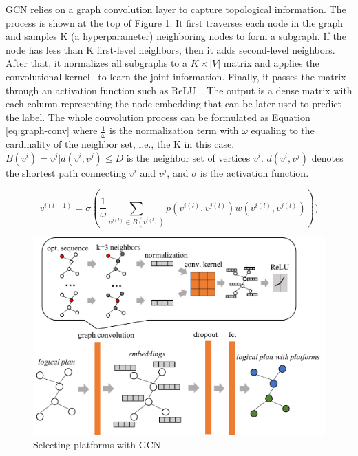 GCN relies on a graph convolution layer to capture topological information. The process is shown at the top of Figure \ref{fig:gcn}. It first traverses each node in the graph and samples K (a hyperparameter) neighboring nodes to form a subgraph. If the node has less than K first-level neighbors, then it adds second-level neighbors. After that, it normalizes all subgraphs to a $K \times |V|$ matrix and applies the convolutional kernel~\cite{dai2017deformable} to learn the joint information. Finally, it passes the matrix through an activation function such as ReLU~\cite{hahnloser2000digital}. The output is a dense matrix with each column representing the node embedding that can be later used to predict the label. The whole convolution process can be formulated as Equation \ref{eq:graph-conv} where $\frac{1}{\omega}$ is the normalization term with $\omega$ equaling to the cardinality of the neighbor set, i.e., the K in this case. $B(v^i) = {v^j | d(v^i, v^j) \leq D }$ is the neighbor set of vertices $v^i$. $d(v^i, v^j)$ denotes the shortest path connecting $v^i$ and $v^j$, and $\sigma$ is the activation function.


\begin{equation}
    v^{i(l+1)} = \sigma (\frac{1}{\omega} \sum_{ v^{j(l)} \in B(v^{i(l)}) } p(v^{i(l)}, v^{j(l)}) w(v^{i(l)}, v^{j(l)})  )  )
    \label{eq:graph-conv}
\end{equation}

\begin{figure}
  \centering
  \includegraphics[width=0.9\linewidth]{figures/gcn.pdf}
  \caption{Selecting platforms with GCN}
  \label{fig:gcn}
\end{figure}

